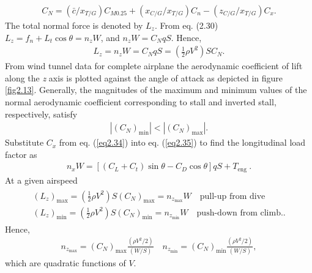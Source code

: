 \documentclass{AeroStructure-ERJohnson}
\begin{document}
\begin{align}\label{eq2.41}
C_{N}=(\bar{c}/x_{T/G}) C_{M 0.25}+(x_{C/G}/x_{T/G}) C_{n}-(z_{C/G}/x_{T/G}) C_{x}.
\end{align}
The total normal force is denoted by $L_{z}$. From eq. (2.30) $L_{z}=f_{n}+L_{t} \cos \theta=n_{z} W$, and $n_{z} W=C_{N} q S$. Hence,
\begin{align}\label{eq2.42}
L_{z}=n_{z} W=C_{N} q S=\left(\frac{1}{2} \rho V^{2}\right) S C_{N}.
\end{align}
\noindent From wind tunnel data for complete airplane the aerodynamic coefficient of lift along the \textit{z} axis is plotted against the angle of attack as depicted in figure \ref{fig2.13}. Generally, the magnitudes of the maximum and minimum values of the normal aerodynamic coefficient corresponding to stall and inverted stall, respectively, satisfy
\begin{align*}
\left|\left(C_{N}\right)_{\min }\right|<\left|\left(C_{N}\right)_{\max }\right|.
\end{align*}
{\def\thefigure{2.13}
}
\noindent Substitute $C_{x}$ from eq. (\ref{eq2.34}) into eq. (\ref{eq2.35}) to find the longitudinal load factor as
\begin{align}\label{eq2.43}
n_{x} W=\left[\left(C_{L}+C_{t}\right) \sin \theta-C_{D} \cos \theta\right] q S+T_{\text {eng }}.
\end{align}
At a given airspeed
\begin{gather}\label{eq2.44}
\begin{array}{c}
\displaystyle\left(L_{z}\right)_{\max }=\left(\frac{1}{2} \rho V^{2}\right) S\left(C_{N}\right)_{\max }=n_{z_{\max }} W \quad \text {pull-up from dive }\\ \displaystyle\left(L_{z}\right)_{\min }=\left(\frac{1}{2} \rho V^{2}\right) S\left(C_{N}\right)_{\min }=n_{z_{\min }} W \quad \text {push-down from climb.}.
\end{array}
\end{gather}
Hence,
\begin{align}\label{eq2.45}
n_{z_{\max }}=\left(C_{N}\right)_{\max } \frac{\left(\rho V^{2}/2\right)}{(W/S)} \quad n_{z_{\min }}=\left(C_{N}\right)_{\min } \frac{\left(\rho V^{2}/2\right)}{(W/S)},
\end{align}
which are quadratic functions of $V$.
\end{document}
